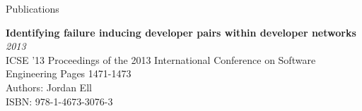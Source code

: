\documentclass{resume} %
\begin{document}

\begin{rSection}{Publications}

{\bf Identifying failure inducing developer pairs within developer networks} \hfill {\em2013} \\ 
ICSE '13 Proceedings of the 2013 International Conference on Software Engineering Pages 1471-1473 \\
Authors: Jordan Ell \\
ISBN: 978-1-4673-3076-3

\end{rSection}

\end{document}
